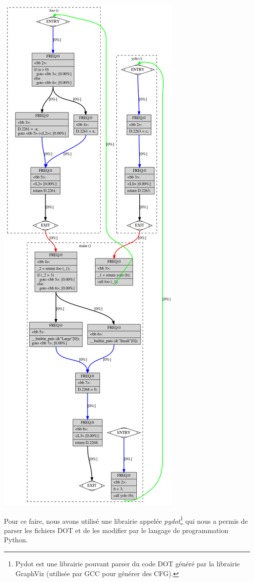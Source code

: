 \begin{center}
    \includegraphics[scale=0.24]{images/cfg_apres.png}
\end{center}
Pour ce faire, nous avons utilisé une librairie appelée \textit{pydot}\footnote{Pydot est une librairie pouvant parser du code DOT généré par la librairie GraphViz (utilisée par GCC pour générer des CFG).} qui nous a permis de parser les fichiers DOT et de les modifier par le langage de programmation Python.

